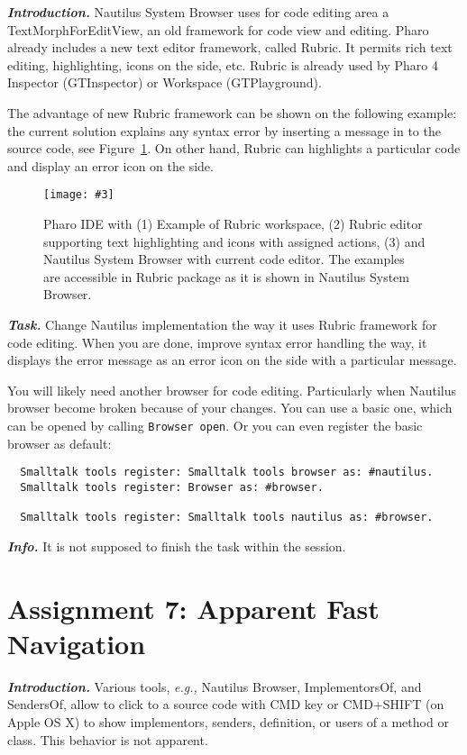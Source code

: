 \documentclass[table,a4paper]{article}
\newcommand{\figref}[1]{Figure~\ref{fig:#1}}
\newcommand{\myparagraph}[1]{\vspace{0.3em}\noindent \textbf{\textit{#1.}}}
\newcommand{\eg}{\emph{e.g.,}}
\newcommand{\ct}[1]{\texttt{#1}}
\newcommand{\fig}[4]{
	\begin{figure}[#1]
		\centering
		\texttt{[image: \#3]}
		\caption{\label{fig:#3}#4}
	\end{figure}}
\begin{document}
\myparagraph{Introduction} Nautilus System Browser uses for code editing area a TextMorphForEditView, an old framework for code view and editing. Pharo already includes a new text editor framework, called Rubric. It permits rich text editing, highlighting, icons on the side, etc. Rubric is already used by Pharo 4 Inspector (GTInspector) or Workspace (GTPlayground).

The advantage of new Rubric framework can be shown on the following example: the current solution explains any syntax error by inserting a message in to the source code, see \figref{nautilus-rubric}. On other hand, Rubric can highlights a particular code and display an error icon on the side.

\fig{h}{1}{nautilus-rubric}{Pharo IDE with (1) Example of Rubric workspace, (2) Rubric editor supporting text highlighting and icons with assigned actions, (3) and Nautilus System Browser with current code editor. The examples are accessible in Rubric package as it is shown in Nautilus System Browser.}

\myparagraph{Task} Change Nautilus implementation the way it uses Rubric framework for code editing. When you are done, improve syntax error handling the way, it displays the error message as an error icon on the side with a particular message. 

You will likely need another browser for code editing. Particularly when Nautilus browser become broken because of your changes. You can use a basic one, which can be opened by calling \ct{Browser open}. Or you can even register the basic browser as default:

\begin{lstlisting}
  Smalltalk tools register: Smalltalk tools browser as: #nautilus.
  Smalltalk tools register: Browser as: #browser.  

  Smalltalk tools register: Smalltalk tools nautilus as: #browser.
\end{lstlisting}

\myparagraph{Info} It is not supposed to finish the task within the session.

\clearpage{}

\section{Assignment 7: Apparent Fast Navigation}
\label{sec:a7}

\myparagraph{Introduction} Various tools, \eg{} Nautilus Browser, ImplementorsOf, and SendersOf, allow to click to a source code with CMD key or CMD+SHIFT (on Apple OS X) to show implementors, senders, definition, or users of a method or class. This behavior is not apparent. 
\end{document}
